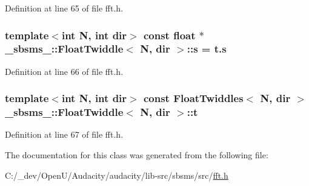 Definition at line 65 of file fft.\+h.

\subsubsection[{\texorpdfstring{s}{s}}]{\setlength{\rightskip}{0pt plus 5cm}template$<$int N, int dir$>$ {\bf const} float $\ast$ {\bf \+\_\+sbsms\+\_\+\+::\+Float\+Twiddle}$<$ {\bf N}, dir $>$\+::{\bf s} = t.\+s\hspace{0.3cm}{\ttfamily [static]}}\hypertarget{class__sbsms___1_1_float_twiddle_a15c969050901d72bc0276c7842e5c203}{}\label{class__sbsms___1_1_float_twiddle_a15c969050901d72bc0276c7842e5c203}


Definition at line 66 of file fft.\+h.

\subsubsection[{\texorpdfstring{t}{t}}]{\setlength{\rightskip}{0pt plus 5cm}template$<$int N, int dir$>$ {\bf const} {\bf Float\+Twiddles}$<$ {\bf N}, dir $>$ {\bf \+\_\+sbsms\+\_\+\+::\+Float\+Twiddle}$<$ {\bf N}, dir $>$\+::t\hspace{0.3cm}{\ttfamily [static]}}\hypertarget{class__sbsms___1_1_float_twiddle_a86888846643be848b3dc3e11e60043e2}{}\label{class__sbsms___1_1_float_twiddle_a86888846643be848b3dc3e11e60043e2}


Definition at line 67 of file fft.\+h.



The documentation for this class was generated from the following file\+:\begin{DoxyCompactItemize}
\item 
C\+:/\+\_\+dev/\+Open\+U/\+Audacity/audacity/lib-\/src/sbsms/src/\hyperlink{lib-src_2sbsms_2src_2fft_8h}{fft.\+h}\end{DoxyCompactItemize}
